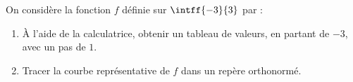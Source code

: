 \begin{exo}{}
	On considère la fonction $f$ définie sur $\intff{-3}{3}$ par : 
	\begin{enumerate}
		\item À l'aide de la calculatrice, obtenir un tableau de valeurs, en partant de $-3$, avec un pas de $1$.
		\item Tracer la courbe représentative de $f$ dans un repère orthonormé.
	\end{enumerate}
\end{exo}
